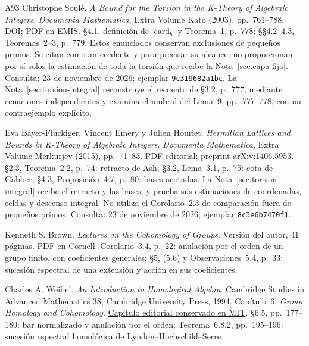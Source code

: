 \begin{thebibliography}{A93}
Christophe Soulé.
\emph{A Bound for the Torsion in the K-Theory of Algebraic Integers}.
\emph{Documenta Mathematica}, Extra Volume Kato (2003), pp.~761--788.
\href{https://doi.org/10.4171/DMS/3/21}{DOI};
\href{https://www.maths.tcd.ie/EMIS/journals/DMJDMV/vol-kato/soule.dm.pdf}{PDF en EMIS}.
§4.1, definición de $\operatorname{card}_b$ y Teorema~1, p.~778;
§§4.2--4.3, Teoremas~2--3, p.~779.
Estos enunciados conservan exclusiones de pequeños primos.
Se citan como antecedente y para precisar su alcance; no
proporcionan por sí solos la estimación de toda la torsión
que recibe la Nota~\ref{sec:capa-fija}.
Consulta: 23 de noviembre de 2026; ejemplar \texttt{9c319682a1bc}.
La Nota~\ref{sec:torsion-integral} reconstruye el recuento de
§3.2, p.~777, mediante ecuaciones independientes y examina
el umbral del Lema~9, pp.~777--778, con un contraejemplo explícito.

Eva Bayer-Fluckiger, Vincent Emery y Julien Houriet.
\emph{Hermitian Lattices and Bounds in K-Theory of Algebraic Integers}.
\emph{Documenta Mathematica}, Extra Volume Merkurjev (2015), pp.~71--83.
\href{https://ems.press/content/book-chapter-files/27436}{PDF editorial};
\href{https://arxiv.org/abs/1406.5953}{preprint arXiv:1406.5953}.
§2.3, Teorema~2.2, p.~74: retracto de Ash;
§3.2, Lema~3.1, p.~75: cota de Gabber;
§4.3, Proposición~4.7, p.~80: bases acotadas.
La Nota~\ref{sec:torsion-integral} recibe el retracto y las
bases, y prueba sus estimaciones de coordenadas, celdas y
descenso integral. No utiliza el Corolario~2.3 de comparación
fuera de pequeños primos.
Consulta: 23 de noviembre de 2026; ejemplar \texttt{8c3e6b7470f1}.

Kenneth S. Brown. \emph{Lectures on the Cohomology of Groups}.
Versión del autor, 41 páginas.
\href{https://pi.math.cornell.edu/~kbrown/papers/cohomology_hangzhou.pdf}{PDF en Cornell}.
Corolario~3.4, p.~22: anulación por el orden de un grupo
finito, con coeficientes generales; §5, (5.6) y
Observaciones~5.4, p.~33: sucesión espectral de una extensión
y acción en sus coeficientes.

Charles A. Weibel. \emph{An Introduction to Homological Algebra}.
Cambridge Studies in Advanced Mathematics 38,
Cambridge University Press, 1994.
Capítulo~6, \emph{Group Homology and Cohomology}.
\href{https://math.mit.edu/~hrm/palestine/weibel/06-group_homology_and_cohomology.pdf}{Capítulo editorial conservado en MIT}.
§6.5, pp.~177--180: bar normalizado y anulación por el orden;
Teorema~6.8.2, pp.~195--196: sucesión espectral homológica
de Lyndon--Hochschild--Serre.


\end{thebibliography}
